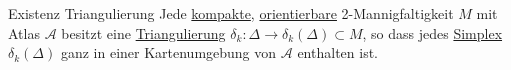 \begin{titleDef}{Existenz Triangulierung}
\label{existenzTriangulierung}
Jede \hyperref[kompakt]{kompakte}, \hyperref[orientierbar]{orientierbare} 2-Mannigfaltigkeit $M$ mit Atlas $\mathcal{A}$ besitzt eine \hyperref[triangulierung]{Triangulierung} $\delta_k:\Delta\to\delta_k(\Delta)\subset M$, so dass jedes \hyperref[simplex]{Simplex} $\delta_k(\Delta)$ ganz in einer Kartenumgebung von $\mathcal{A}$ enthalten ist.
\end{titleDef}
